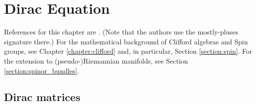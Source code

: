 \chapter{Dirac Equation}\label{chapter:dirac}

    References for this chapter are \cite{supergravity}. (Note that the authors use the mostly-pluses signature there.) For the mathematical background of Clifford algebras and Spin groups, see Chapter \ref{chapter:clifford} and, in particular, Section \ref{section:spin}. For the extension to (pseudo-)Riemannian manifolds, see Section \ref{section:spinor_bundles}.

\section{Dirac matrices}

